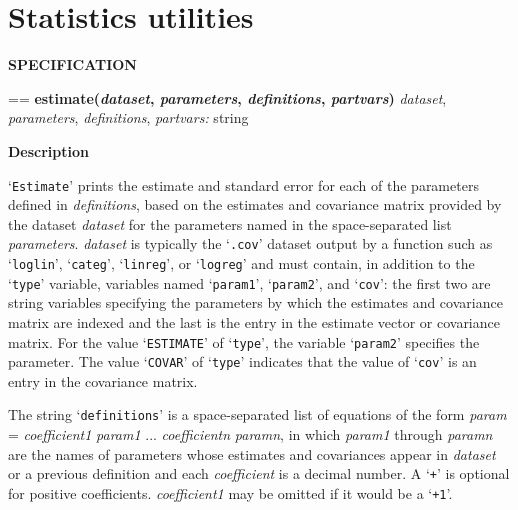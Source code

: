 \documentclass{book}
\makeatletter
\newcommand\Texinfocommandstyletextvar[1]{{\normalfont{}\textsl{#1}}}%
\newenvironment{Texinfopreformatted}{%
  \par\GNUTobeylines\obeyspaces\frenchspacing\parskip=\z@\parindent=\z@}{}
{\catcode`\^^M=13 \gdef\GNUTobeylines{\catcode`\^^M=13 \def^^M{\null\par}}}
\newenvironment{Texinfoindented}{\begin{list}{}{}\item\relax}{\end{list}}
\renewcommand{\_}{\Texinfounderscore\discretionary{}{}{}}
\makeatother
\begin{document}
\section{{Statistics utilities}}
\label{anchor:Statistics-utilities}%

\noindent{}\textbf{SPECIFICATION}
\begin{Texinfoindented}
\begin{Texinfopreformatted}%
\textbf{estimate(\Texinfocommandstyletextvar{dataset}, \Texinfocommandstyletextvar{parameters}, \Texinfocommandstyletextvar{definitions}, \Texinfocommandstyletextvar{partvars})}
\Texinfocommandstyletextvar{dataset}, \Texinfocommandstyletextvar{parameters}, \Texinfocommandstyletextvar{definitions}, \Texinfocommandstyletextvar{partvars:} string
\end{Texinfopreformatted}
\end{Texinfoindented}
%
%
%
%
%

\noindent{}\textbf{Description}

`\texttt{Estimate}' prints the estimate and standard error for each of
the parameters defined in \Texinfocommandstyletextvar{definitions}, based on the estimates and covariance matrix
provided by the dataset \Texinfocommandstyletextvar{dataset} for the parameters named in the space-separated
list \Texinfocommandstyletextvar{parameters}.
\Texinfocommandstyletextvar{dataset} is typically the `\texttt{.cov}' dataset output by a
function such as `\texttt{loglin}', `\texttt{categ}', `\texttt{linreg}', or `\texttt{logreg}' and
must contain, in addition to the `\texttt{\_type\_}' variable, variables named
`\texttt{\_param1\_}', `\texttt{\_param2\_}', and `\texttt{\_cov\_}': the first two are string variables
specifying the parameters by which the estimates and covariance matrix are indexed
and the last is the entry in the estimate vector or covariance matrix.
For the value `\texttt{ESTIMATE}' of `\texttt{\_type\_}', the variable `\texttt{\_param2\_}'
specifies the parameter. The value `\texttt{COVAR}' of `\texttt{\_type\_}' indicates that
the value of `\texttt{\_cov\_}' is an entry in the covariance matrix.

The string `\texttt{definitions}' is a space-separated list of equations of the form
\Texinfocommandstyletextvar{param} = \Texinfocommandstyletextvar{coefficient\_1} \Texinfocommandstyletextvar{param\_1} ... \Texinfocommandstyletextvar{coefficient\_n} \Texinfocommandstyletextvar{param\_n}, in which
\Texinfocommandstyletextvar{param\_1} through \Texinfocommandstyletextvar{param\_n} are the names of parameters whose
estimates and covariances appear in \Texinfocommandstyletextvar{dataset} or a previous definition
and each \Texinfocommandstyletextvar{coefficient} is a decimal number.
A `\texttt{+}' is optional for positive coefficients.
\Texinfocommandstyletextvar{coefficient\_1} may be omitted if it would be a `\texttt{+1}'.
\end{document}
